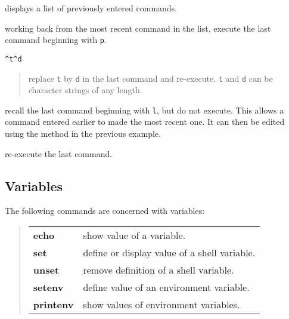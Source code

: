 \goodbreak

\exbegin

{displays a list of previously entered commands.}

{working back from the most recent command in the list, execute the last
command beginning with {\tt p}.}

{\tt \verb+^t^d+}
\vspace*{-5mm}
\begin{quote}
{\small   replace {\tt t} by {\tt d} in the last command and re-execute.
  {\tt t} and {\tt d} can be character strings of any length.}
\end{quote}

{recall the last command beginning with {\tt l}, but do not execute.
This allows a command entered earlier to made the most recent one.
It can then be edited using the method in the previous example.}

\example{!!}
{re-execute the last command.}

\exend

\subsection{Variables}

The following commands are concerned with variables:
\begin{quote}
\begin{tabular}{lp{67mm}}

{\bf echo}     & show value of a variable.\\
{\bf set}      & define or display value of a shell variable.\\
{\bf unset}    & remove definition of a shell variable.\\
{\bf setenv}   & define value of an environment variable.\\
{\bf printenv} & show values of environment variables.

\end{tabular}
\end{quote}

